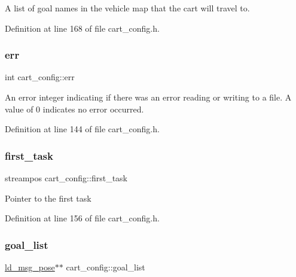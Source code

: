 A list of goal names in the vehicle map that the cart will travel to. 

Definition at line 168 of file cart\+\_\+config.\+h.

\mbox{\label{classcart__config_a5b331a578d28d3abec6625ac8952fe37}} 
\subsubsection{\texorpdfstring{err}{err}}
{\footnotesize\ttfamily int cart\+\_\+config\+::err\hspace{0.3cm}{\ttfamily [private]}}

An error integer indicating if there was an error reading or writing to a file. A value of 0 indicates no error occurred. 

Definition at line 144 of file cart\+\_\+config.\+h.

\mbox{\label{classcart__config_af683646edbe7260d8b12bc4fe4f885db}} 
\subsubsection{\texorpdfstring{first\+\_\+task}{first\_task}}
{\footnotesize\ttfamily streampos cart\+\_\+config\+::first\+\_\+task\hspace{0.3cm}{\ttfamily [private]}}

Pointer to the first task 

Definition at line 156 of file cart\+\_\+config.\+h.

\mbox{\label{classcart__config_ac484fbaf3da5c3fcbf6b0b338ebf7812}} 
\subsubsection{\texorpdfstring{goal\+\_\+list}{goal\_list}}
{\footnotesize\ttfamily \mbox{\hyperlink{structld__msg__pose}{ld\+\_\+msg\+\_\+pose}}$\ast$$\ast$ cart\+\_\+config\+::goal\+\_\+list\hspace{0.3cm}{\ttfamily [private]}}

